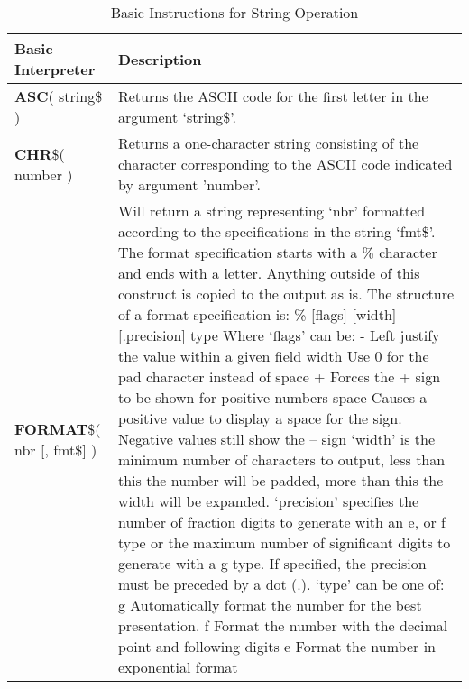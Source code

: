 \begin{table}[]
\centering
\caption{Basic Instructions for String Operation}
\label{Basic_Instructions_for_String_Operation}
\begin{tabular}{|p{4cm}|p{10cm}|}
\hline
\textbf{Basic Interpreter} & \textbf{Description}                                                   
\\ \hline
\textbf{ASC}( string\$ ) & Returns the ASCII code for the first letter in the argument ‘string\$’.
\\ \hline
\textbf{CHR}\$( number ) & Returns a one-character string consisting of the character corresponding
to the ASCII code indicated by argument 'number'.
\\ \hline
\textbf{FORMAT}\$( nbr [, fmt\$] ) & Will return a string representing ‘nbr’ formatted according to the specifications in the string ‘fmt\$’. \newline
The format specification starts with a \% character and ends with a letter.
Anything outside of this construct is copied to the output as is.\newline
The structure of a format specification is:\newline
\% [flags] [width] [.precision] type Where ‘flags’ can be:\newline
- Left justify the value within a given field width \newline
0 Use 0 for the pad character instead of space\newline
+ Forces the + sign to be shown for positive numbers\newline
space Causes a positive value to display a space for the sign.
Negative values still show the – sign\newline
‘width’ is the minimum number of characters to output, less than this the
number will be padded, more than this the width will be expanded. \newline
‘precision’ specifies the number of fraction digits to generate with an e,
or f type or the maximum number of significant digits to generate with a
g type. If specified, the precision must be preceded by a dot (.).\newline
‘type’ can be one of: \newline
g Automatically format the number for the best presentation.\newline
f Format the number with the decimal point and following digits\newline
e Format the number in exponential format\newline

\end{tabular}
\end{table}
